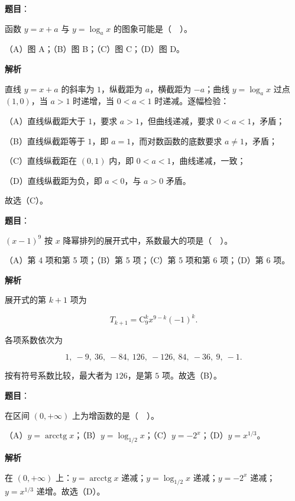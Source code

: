 \begin{answer}

\textbf{题目}：

函数 $y=x+a$ 与 $y=\log_a x$ 的图象可能是（　）。

（A）图 A；（B）图 B；（C）图 C；（D）图 D。
\nopagebreak[4]
\begin{center}\end{center}
\nopagebreak[4]
\textbf{解析}

直线 $y=x+a$ 的斜率为 $1$，纵截距为 $a$，横截距为 $-a$；曲线 $y=\log_a x$ 过点 $(1,0)$，当 $a>1$ 时递增，当 $0<a<1$ 时递减。逐幅检验：

（A）直线纵截距大于 $1$，要求 $a>1$，但曲线递减，要求 $0<a<1$，矛盾；

（B）直线纵截距等于 $1$，即 $a=1$，而对数函数的底数要求 $a\ne1$，矛盾；

（C）直线纵截距在 $(0,1)$ 内，即 $0<a<1$，曲线递减，一致；

（D）直线纵截距为负，即 $a<0$，与 $a>0$ 矛盾。

故选（C）。


\end{answer}
\begin{answer}

\textbf{题目}：

$(x-1)^9$ 按 $x$ 降幂排列的展开式中，系数最大的项是（　）。

（A）第 4 项和第 5 项；（B）第 5 项；（C）第 5 项和第 6 项；（D）第 6 项。

\textbf{解析}

展开式的第 $k+1$ 项为

\nopagebreak[4]
\[
T_{k+1}=\mathrm C_9^k x^{9-k}(-1)^k.
\]

各项系数依次为

\nopagebreak[4]
\[
1,\ -9,\ 36,\ -84,\ 126,\ -126,\ 84,\ -36,\ 9,\ -1.
\]

按有符号系数比较，最大者为 $126$，是第 $5$ 项。故选（B）。


\end{answer}
\begin{answer}

\textbf{题目}：

在区间 $(0,+\infty)$ 上为增函数的是（　）。

（A）$y=\operatorname{arcctg}x$；（B）$y=\log_{1/2}x$；（C）$y=-2^x$；（D）$y=x^{1/3}$。

\textbf{解析}

在 $(0,+\infty)$ 上：$y=\operatorname{arcctg}x$ 递减；$y=\log_{1/2}x$ 递减；$y=-2^x$ 递减；$y=x^{1/3}$ 递增。故选（D）。


\end{answer}
